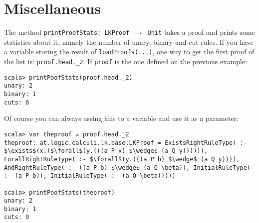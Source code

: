 \documentclass[a4paper,11pt]{article}
\begin{document}
\section{Miscellaneous}

The method \texttt{printProofStats: LKProof $\rightarrow$ Unit}
takes a proof and prints some statistics about it, namely the number
of unary, binary and cut rules. If you have a variable storing the result of 
\texttt{loadProofs(...)}, one way to get the first proof of the list is: 
\texttt{proof.head.\_2}. If \texttt{proof} is the one defined on the previous 
example:

\begin{lstlisting}
scala> printPoofStats(proof.head._2)
unary: 2
binary: 1
cuts: 0
\end{lstlisting}

Of course you can always assing this to a variable and use it as a parameter:

\begin{lstlisting}
scala> var theproof = proof.head._2
theproof: at.logic.calculi.lk.base.LKProof = ExistsRightRuleType( :- $\exists$(x.($\forall$(y.(((a P x) $\wedge$ (a Q y)))))), ForallRightRuleType( :- $\forall$(y.(((a P b) $\wedge$ (a Q y)))), AndRightRuleType( :- ((a P b) $\wedge$ (a Q \beta)), InitialRuleType( :- (a P b)), InitialRuleType( :- (a Q \beta)))))

scala> printPoofStats(theproof)
unary: 2
binary: 1
cuts: 0
\end{lstlisting}
\end{document}
